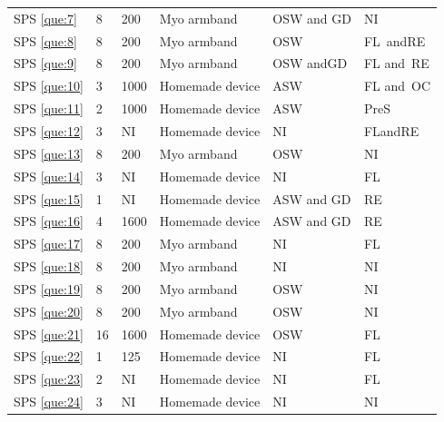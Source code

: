 \documentclass[sensors,review,accept,moreauthors,pdftex]{Definitions/mdpi}
\begin{document}
\begin{table}[H]
\begin{tabular}{m{30pt}m{44pt}m{40pt}m{113pt}m{67pt}m{70pt}}
		SPS \ref{que:7}	&	8	&	200	&	Myo armband& OSW and GD&NI\\
								
		SPS \ref{que:8}	&	8	&	200	&	Myo armband& OSW&FL~andRE\\
								
		SPS \ref{que:9}	&	8	&	200	&	Myo armband& OSW andGD&FL and~RE\\
								
		SPS \ref{que:10}	&	3	&	1000	&	Homemade device&ASW&FL and~OC\\
								
		SPS \ref{que:11}	&	2	&	1000	&	Homemade device& ASW&PreS\\
								
		SPS \ref{que:12}	&	3	&	NI	&	Homemade device& NI&FLandRE\\
								
		SPS \ref{que:13}	&	8	&	200	&	Myo armband& OSW&NI\\
								
		SPS \ref{que:14}	&	3	&	NI	&	Homemade device&NI&FL \\
								
		SPS \ref{que:15}	&	1	&	NI	&	Homemade device& ASW and GD&RE\\
								
		SPS \ref{que:16}	&	4	&	1600	&	Homemade device& ASW and GD&RE\\
								
		SPS \ref{que:17}	&	8	&	200	&	Myo armband & NI&FL\\
								
		SPS \ref{que:18}	&	8	&	200	&	Myo armband& NI&NI\\
								
		SPS \ref{que:19}	&	8	&	200	&	Myo armband&OSW&NI \\
								
		SPS \ref{que:20}	&	8	&	200	&	Myo armband&OSW&NI \\
								
		SPS \ref{que:21}	&	16	&	1600	&	Homemade device&OSW&FL\\
								
		SPS \ref{que:22}	&	1	&	125	&	Homemade device&NI&FL\\
								
		SPS \ref{que:23}	&	2	&	NI	&	Homemade device& NI&FL\\
								
		SPS \ref{que:24}	&	3	&	NI	&	Homemade device& NI&NI\\
								

\end{tabular}
\end{table}
\end{document}
